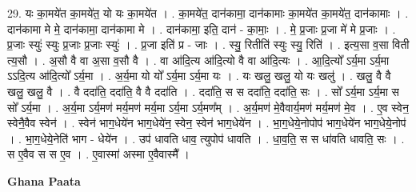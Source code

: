 \documentclass[17pt]{extarticle}
\begin{document}
29. यः का॒मये॑त का॒मये॑त॒ यो यः का॒मये॑त । . का॒मये॑त॒ दान॑कामा॒ दान॑कामाः का॒मये॑त का॒मये॑त॒ दान॑कामाः । . दान॑कामा मे मे॒ दान॑कामा॒ दान॑कामा मे । . दान॑कामा॒ इति॒ दान॑ - का॒माः॒ । . मे॒ प्र॒जाः प्र॒जा मे॑ मे प्र॒जाः । . प्र॒जाः स्युः॑ स्युः प्र॒जाः प्र॒जाः स्युः॑ । . प्र॒जा इति॑ प्र - जाः । . स्यु॒ रितीति॑ स्युः स्यु॒ रिति॑ । . इत्य॒सा व॒सा विती त्य॒सौ । . अ॒सौ वै वा अ॒सा व॒सौ वै । . वा आ॑दि॒त्य आ॑दि॒त्यो वै वा आ॑दि॒त्यः । . आ॒दि॒त्यो᳚ ऽर्य॒मा ऽर्य॒मा ऽऽदि॒त्य आ॑दि॒त्यो᳚ ऽर्य॒मा । . अ॒र्य॒मा यो यो᳚ ऽर्य॒मा ऽर्य॒मा यः । . यः खलु॒ खलु॒ यो यः खलु॑ । . खलु॒ वै वै खलु॒ खलु॒ वै । . वै ददा॑ति॒ ददा॑ति॒ वै वै ददा॑ति । . ददा॑ति॒ स स ददा॑ति॒ ददा॑ति॒ सः । . सो᳚ ऽर्य॒मा ऽर्य॒मा स सो᳚ ऽर्य॒मा । . अ॒र्य॒मा ऽर्य॒मण॑ मर्य॒मण॑ मर्य॒मा ऽर्य॒मा ऽर्य॒मण᳚म् । . अ॒र्य॒मण॑ मे॒वैवार्य॒मण॑ मर्य॒मण॑ मे॒व । . ए॒व स्वेन॒ स्वेनै॒वैव स्वेन॑ । . स्वेन॑ भाग॒धेये॑न भाग॒धेये॑न॒ स्वेन॒ स्वेन॑ भाग॒धेये॑न । . भा॒ग॒धेये॒नोपोप॑ भाग॒धेये॑न भाग॒धेये॒नोप॑ । . भा॒ग॒धेये॒नेति॑ भाग - धेये॑न । . उप॑ धावति धाव॒ त्युपोप॑ धावति । . धा॒व॒ति॒ स स धा॑वति धावति॒ सः । . स ए॒वैव स स ए॒व । . ए॒वास्मा॑ अस्मा ए॒वैवास्मै᳚ । \newline

\textbf{Ghana Paata } \newline
\end{document}
